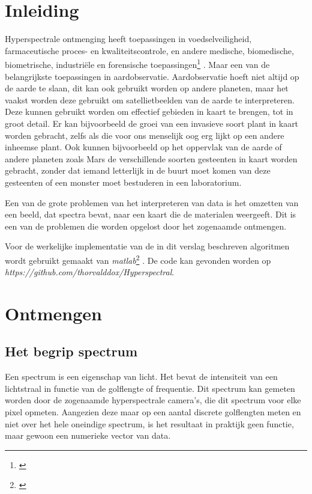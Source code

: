 \documentclass[12pt]{report}
\newcommand{\footcite}[1]{\cite{#1}\let\thefootnote\relax \footnote{\cite{#1} \bibentry{#1}} }
\begin{document}
\newpage
\chapter*{Inleiding}

Hyperspectrale ontmenging heeft toepassingen in voedselveiligheid, farmaceutische proces- en kwaliteitscontrole, en andere medische, biomedische, biometrische, industri\"ele en forensische toepassingen\footcite{dias12}. Maar een van de belangrijkste toepassingen in aardobservatie. Aardobservatie hoeft niet altijd op de aarde te slaan, dit kan ook gebruikt worden op andere planeten, maar het vaakst worden deze gebruikt om satellietbeelden van de aarde te interpreteren. Deze kunnen gebruikt worden om effectief gebieden in kaart te brengen, tot in groot detail. Er kan bijvoorbeeld de groei van een invasieve soort plant in kaart worden gebracht, zelfs als die voor ons menselijk oog erg lijkt op een andere inheemse plant. Ook kunnen bijvoorbeeld op het oppervlak van de aarde of andere planeten zoals Mars de verschillende soorten gesteenten in kaart worden gebracht, zonder dat iemand letterlijk in de buurt moet komen van deze gesteenten of een monster moet bestuderen in een laboratorium.

Een van de grote problemen van het interpreteren van data is het omzetten van een beeld, dat spectra bevat, naar een kaart die de materialen weergeeft. Dit is een van de problemen die worden opgelost door het zogenaamde ontmengen.

Voor de werkelijke implementatie van de in dit verslag beschreven algoritmen wordt gebruikt gemaakt van \textit{matlab}\footcite{MATLAB}. De code kan gevonden worden op \\ \textit{https://github.com/thorvalddox/Hyperspectral}.

\chapter{Ontmengen}

\section{Het begrip spectrum}


Een spectrum is een eigenschap van licht. Het bevat de intensiteit van een lichtstraal in functie van de golflengte of frequentie. Dit spectrum kan gemeten worden door de zogenaamde hyperspectrale camera's, die dit spectrum voor elke pixel opmeten. Aangezien deze maar op een aantal discrete golflengten meten en niet over het hele oneindige spectrum, is het resultaat in praktijk geen functie, maar gewoon een numerieke vector van data.
\end{document}
